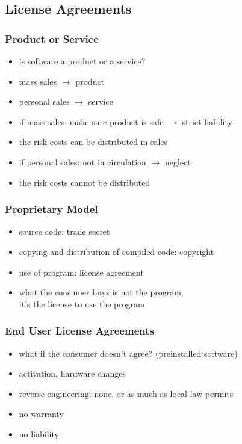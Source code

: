 \documentclass[dvipsnames]{beamer}
\theoremstyle{plain}
\begin{document}
\subsection{License Agreements}

\begin{frame}
  \frametitle{Product or Service}

  \begin{itemize}
    \item is software a product or a service?
    \item mass sales $\rightarrow$ product
    \item personal sales $\rightarrow$ service

    \pause
    \bigskip
    \item if mass sales: make sure product is safe $\rightarrow$ strict liability
    \item the risk costs can be distributed in sales

    \medskip
    \item if personal sales: not in circulation $\rightarrow$ neglect
    \item the risk costs cannot be distributed
  \end{itemize}
\end{frame}

\begin{frame}
  \frametitle{Proprietary Model}

  \begin{itemize}
    \item source code: trade secret
    \item copying and distribution of compiled code: copyright
    \item use of program: license agreement

    \pause
    \medskip
    \item what the consumer buys is not the program,\\
      it's the \alert{license} to use the program
  \end{itemize}
\end{frame}

\begin{frame}
  \frametitle{End User License Agreements}

  \begin{itemize}
    \item what if the consumer doesn't agree? (preinstalled software)
    \item activation, hardware changes
    \item reverse engineering: none, or as much as local law permits
    \item no warranty
    \item no liability
  \end{itemize}
\end{frame}
\end{document}
